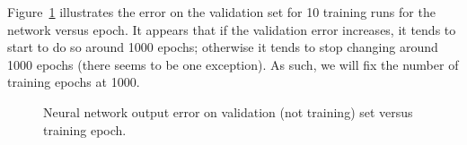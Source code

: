  
Figure~\ref{fig:epochs} illustrates the error on the validation set for 10
training runs for the network versus epoch. It appears that if the validation
error increases, it tends to start to do so around 1000 epochs; otherwise it
tends to stop changing around 1000 epochs (there seems to be one exception). As
such, we will fix the number of training epochs at 1000.  

\begin{figure}
\centering

\vspace*{-5pt}
\caption{Neural network output error on validation (not training) set versus
training epoch.}
\label{fig:epochs}
\end{figure}

